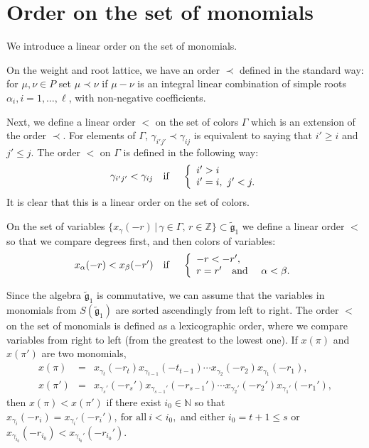 \documentclass[a4paper, 10pt,oneside]{amsart}
\begin{document}
\section{Order on the set of monomials}

\label{uredjaj_sect}

We introduce a linear order on the set of monomials.

On the weight and root lattice, we have an order $\prec$ defined
in the standard way: for $\mu,\nu\in P$ set $\mu\prec\nu$ if $\mu-\nu$
is an integral linear combination of simple roots $\alpha_i, i=1,\dots,\ell$, with non-negative coefficients.

Next, we define a linear order $<$ on the set of colors $\Gamma$ which is an extension of the order $\prec$.
For elements of $\Gamma$, $\gamma_{i'j'}\prec\gamma_{ij}$ is equivalent to saying that
$i'\geq i$ and $j'\leq j$. The order $<$ on $\Gamma$ is defined in the following way:
$$\gamma_{i'j'}<\gamma_{ij}\textrm{\quad if \quad}\left\{\begin{array}{l}i'>i \\ i'=i,\ j'<j.  \end{array}\right.$$
It is clear that this is a linear order on the set of colors.

On the set of variables
$\{x_\gamma(-r)\,|\,\gamma\in\Gamma,\,r\in{{\mathbb Z}}\}\subset {\tilde{{\mathfrak g}}}_1$ we
define a linear order $<$ so that we compare degrees first, and then colors of
variables:
$$x_\alpha(-r)<x_\beta(-r') \textrm{\quad if \quad}
\left\{\begin{array}{l}
-r<-r',\\
r=r' \textrm{\quad and \quad} \alpha<\beta.
\end{array}\right. $$

Since the algebra ${\tilde{{\mathfrak g}}}_1$ is commutative, we can assume that the
variables in monomials from $S({\tilde{{\mathfrak g}}}_1)$  are sorted ascendingly
from left to right. The order $<$ on the set of monomials is
defined as a lexicographic order, where we compare variables from
right to left (from the greatest to the lowest one). If $x(\pi)$
and $x(\pi')$ are two monomials,
\begin{eqnarray*}
x(\pi) & = & x_{\gamma_t}(-r_t) x_{\gamma_{t-1}}(-t_{t-1})\cdots
x_{\gamma_2}(-r_2)x_{\gamma_1}(-r_1),\\
x(\pi') & = & x_{\gamma_s'}(-r_s')
x_{\gamma_{s-1}'}(-r_{s-1}')\cdots
x_{\gamma_2'}(-r_2')x_{\gamma_1'}(-r_1'),
\end{eqnarray*}
then $x(\pi)<x(\pi')$ if there exist $i_0\in {{\mathbb N}}$ so that
$x_{\gamma_i}(-r_i)=x_{\gamma_i'}(-r_i'),\ \textrm{for all}\ i <
i_0,$ and either $i_0=t+1\leq s$ or
$x_{\gamma_{i_0}}(-r_{i_0})<x_{\gamma_{i_0}'}(-r_{i_0}')$.
\end{document}
